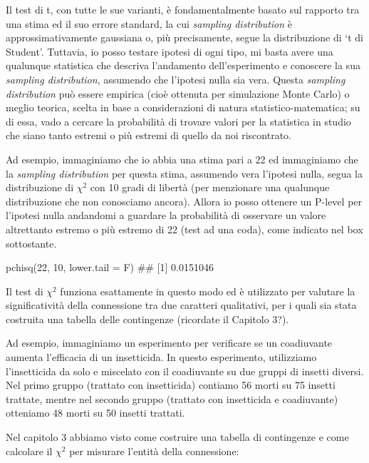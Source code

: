 \documentclass[a4paper,12pt,oneside]{book}
\newenvironment{Shaded}{\begin{snugshade}}{\end{snugshade}}
\newcommand{\DecValTok}[1]{#1}
\newcommand{\DocumentationTok}[1]{#1}
\newcommand{\FunctionTok}[1]{#1}
\newcommand{\AttributeTok}[1]{#1}
\newcommand{\NormalTok}[1]{#1}
\begin{document}
Il test di t, con tutte le sue varianti, è fondamentalmente basato sul rapporto tra una stima ed il suo errore standard, la cui \emph{sampling distribution} è approssimativamente gaussiana o, più precisamente, segue la distribuzione di `t di Student'. Tuttavia, io posso testare ipotesi di ogni tipo, mi basta avere una qualunque statistica che descriva l'andamento dell'esperimento e conoscere la sua \emph{sampling distribution}, assumendo che l'ipotesi nulla sia vera. Questa \emph{sampling distribution} può essere empirica (cioè ottenuta per simulazione Monte Carlo) o meglio teorica, scelta in base a considerazioni di natura statistico-matematica; su di essa, vado a cercare la probabilità di trovare valori per la statistica in studio che siano tanto estremi o più estremi di quello da noi riscontrato.

Ad esempio, immaginiamo che io abbia una stima pari a 22 ed immaginiamo che la \emph{sampling distribution} per questa stima, assumendo vera l'ipotesi nulla, segua la distribuzione di \(\chi^2\) con 10 gradi di libertà (per menzionare una qualunque distribuzione che non conosciamo ancora). Allora io posso ottenere un P-level per l'ipotesi nulla andandomi a guardare la probabilità di osservare un valore altrettanto estremo o più estremo di 22 (test ad una coda), come indicato nel box sottostante.

\begin{Shaded}
\begin{Highlighting}[]
\FunctionTok{pchisq}\NormalTok{(}\DecValTok{22}\NormalTok{, }\DecValTok{10}\NormalTok{, }\AttributeTok{lower.tail =}\NormalTok{ F)}
\DocumentationTok{\#\# [1] 0.0151046}
\end{Highlighting}
\end{Shaded}

Il test di \(\chi^2\) funziona esattamente in questo modo ed è utilizzato per valutare la significatività della connessione tra due caratteri qualitativi, per i quali sia stata costruita una tabella delle contingenze (ricordate il Capitolo 3?).

Ad esempio, immaginiamo un esperimento per verificare se un coadiuvante aumenta l'efficacia di un insetticida. In questo esperimento, utilizziamo l'insetticida da solo e miscelato con il coadiuvante su due gruppi di insetti diversi. Nel primo gruppo (trattato con insetticida) contiamo 56 morti su 75 insetti trattate, mentre nel secondo gruppo (trattato con insetticida e coadiuvante) otteniamo 48 morti su 50 insetti trattati.

Nel capitolo 3 abbiamo visto come costruire una tabella di contingenze e come calcolare il \(\chi^2\) per misurare l'entità della connessione:
\end{document}
